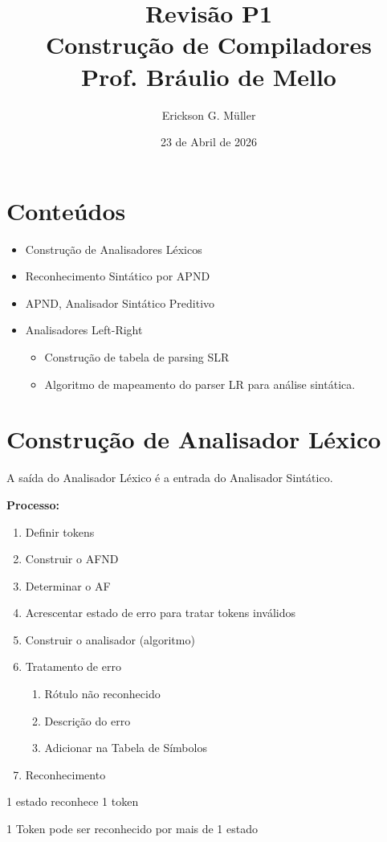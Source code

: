 \documentclass[ 12pt, a4paper]{article}
\title{Revisão P1\\Construção de Compiladores\\Prof. Bráulio de Mello}
\author{Erickson G. Müller}
\date{23 de Abril de 2026}
\begin{document}
\maketitle
\section*{Conteúdos}
	\begin{itemize}
		\item Construção de Analisadores Léxicos
		\item Reconhecimento Sintático por APND
		\item APND, Analisador Sintático Preditivo
		\item Analisadores Left-Right
			\begin{itemize}
				\item Construção de tabela de parsing SLR
				\item Algoritmo de mapeamento do parser LR para análise sintática.
			\end{itemize}
	\end{itemize}
\newpage


\section{Construção de Analisador Léxico}

	A saída do Analisador Léxico é a entrada do Analisador Sintático.

\textbf{Processo:}
	\begin{enumerate}
		\item Definir tokens
		\item Construir o AFND
		\item Determinar o AF
		\item Acrescentar estado de erro para tratar tokens inválidos
		\item Construir o analisador (algoritmo)
		\item Tratamento de erro
		\begin{enumerate}
			\item Rótulo não reconhecido
			\item Descrição do erro
			\item Adicionar na Tabela de Símbolos
		\end{enumerate}
		\item Reconhecimento
	\end{enumerate}
	
	1 estado reconhece 1 token
	
	1 Token pode ser reconhecido por mais de 1 estado
\end{document}
